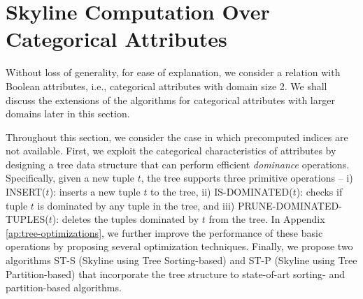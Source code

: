 \section{Skyline Computation Over Categorical Attributes}\label{sec:3}
Without loss of generality, for ease of explanation, we consider a relation with Boolean attributes, i.e., categorical attributes with domain size 2. We shall discuss the extensions of the algorithms for categorical attributes with larger domains later in this section.

Throughout this section, we consider the case in which precomputed indices are not available. First, we exploit the categorical characteristics of attributes by designing a tree data structure that can perform efficient {\em dominance} operations. Specifically, given a new tuple $t$, the tree supports three primitive operations -- i) INSERT($t$): inserts a new tuple $t$ to the tree, ii) IS-DOMINATED($t$): checks if tuple $t$ is dominated by any tuple in the tree, and iii) PRUNE-DOMINATED-TUPLES($t$): deletes the tuples dominated by $t$ from the tree. In Appendix \ref{ap:tree-optimizations}, we further improve the performance of these basic operations by proposing several optimization techniques. Finally, we propose two algorithms ST-S (Skyline using Tree Sorting-based) and ST-P (Skyline using Tree Partition-based) that incorporate the tree structure to state-of-art sorting- and partition-based algorithms.


